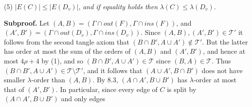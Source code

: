 \hspace*{12pt}(5) $|E(C)| \le |E(D_v)|$, \textit{and if equality holds then} $\lambda(C) \le \lambda(D_v)$.

\textbf{Subproof.} Let $(A, B) = (\Gamma \cap out(F), \Gamma \cap ins(F))$, and $(A', B') = (\Gamma \cap out(D_v), \Gamma \cap ins(D_v))$. Since $(A, B), (A', B') \in \mathscr{T}'$ it follows from the second tangle axiom that $(B \cap B', A \cup A') \notin \mathscr{T}'$. But the latter has order at most the sum of the orders of $(A, B)$ and $(A', B')$, and hence at most $4\rho + 4$ by (1), and so $(B \cap B', A \cup A') \in \mathscr{T}$ since $(B, A) \in \mathscr{T}$. Thus $(B \cap B', A \cup A') \in \mathscr{T} \setminus \mathscr{T}'$, and it follows that $(A \cup A', B \cap B')$ does not have smaller $\lambda$-order than $(A, B)$. By 8.3, $(A \cap A', B \cup B')$ has $\lambda$-order at most that of $(A', B')$. In particular, since every edge of $C$ is split by $(A \cap A', B \cup B')$ and only edges
